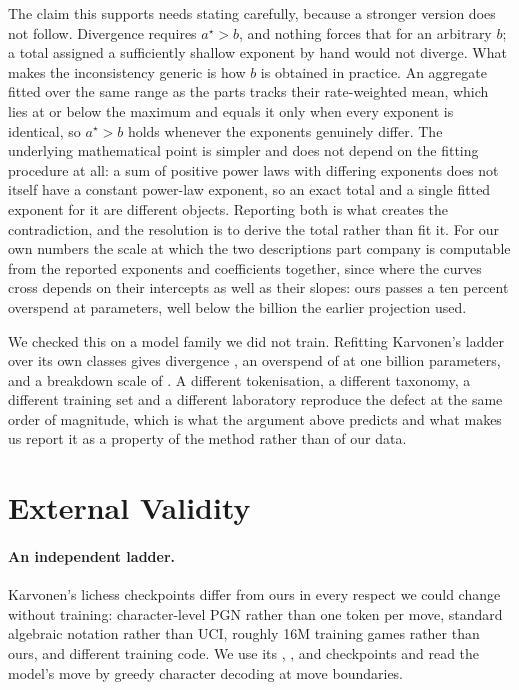 \documentclass[11pt]{article}
\begin{document}
The claim this supports needs stating carefully, because a stronger version does not
follow. Divergence requires $a^\star > b$, and nothing forces that for an arbitrary
$b$; a total assigned a sufficiently shallow exponent by hand would not diverge. What
makes the inconsistency generic is how $b$ is obtained in practice. An aggregate
fitted over the same range as the parts tracks their rate-weighted mean, which lies at
or below the maximum and equals it only when every exponent is identical, so
$a^\star > b$ holds whenever the exponents genuinely differ. The underlying
mathematical point is simpler and does not depend on the fitting procedure at all: a
sum of positive power laws with differing exponents does not itself have a constant
power-law exponent, so an exact total and a single fitted exponent for it are
different objects. Reporting both is what creates the contradiction, and the
resolution is to derive the total rather than fit it. For our own numbers the scale at
which the two descriptions part company is computable from
the reported exponents and coefficients together, since where the curves cross depends
on their intercepts as well as their slopes: ours passes a ten percent overspend at
 parameters, well below the billion the earlier projection
used.

We checked this on a model family we did not train. Refitting Karvonen's ladder
over its own  classes gives divergence ,
an overspend of  at one billion parameters, and a breakdown
scale of . A different tokenisation, a different taxonomy,
a different training set and a different laboratory reproduce the defect at the
same order of magnitude, which is what the argument above predicts and what makes
us report it as a property of the method rather than of our data.

\section{External Validity}
\label{sec:external}

\paragraph{An independent ladder.}
Karvonen's lichess checkpoints \citep{karvonen2024emergent} differ from ours in
every respect we could change without training: character-level PGN rather than
one token per move, standard algebraic notation rather than UCI, roughly 16M
training games rather than ours, and different training code. We use its
, , and  checkpoints
and read the model's move by greedy character decoding at move boundaries.
\end{document}
